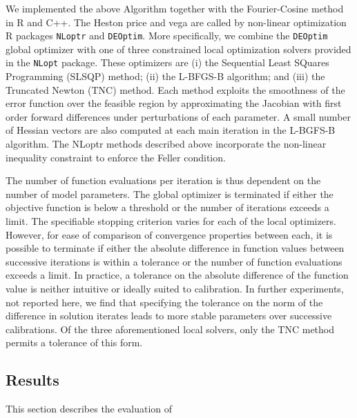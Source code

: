\documentclass{article}
\begin{document}
We implemented the above Algorithm together with the Fourier-Cosine method in R and C++. The Heston price and vega are called by non-linear optimization R packages \verb|NLoptr| and \verb|DEOptim|\cite{Price2006,Ardia2011b}.  More specifically, we combine the \verb|DEOptim| global optimizer with  
one of three constrained local optimization solvers provided in the \verb|NLopt| package. These optimizers are (i) the Sequential Least SQuares Programming (SLSQP) method; (ii) the L-BFGS-B algorithm; and (iii) the Truncated Newton (TNC) method.  Each method exploits the smoothness of the error function over the feasible region by approximating the Jacobian with first order forward differences under perturbations of each parameter.  A small number of Hessian vectors are also computed at each main iteration in the L-BGFS-B algorithm.  The  NLoptr methods described above incorporate the non-linear inequality constraint to enforce the Feller condition.

The number of function evaluations per iteration is thus dependent on the number of model parameters. The global optimizer is terminated if either the objective function is below a threshold or the number of iterations exceeds a limit. The specifiable stopping criterion varies for each of the local optimizers. However, for ease of comparison of convergence properties between each,  it is possible to terminate if either the absolute difference in function values  between successive iterations is within a tolerance or the number of function evaluations exceeds a limit.  In practice, a tolerance on the absolute difference of the function value is neither intuitive or ideally suited to calibration.  In further experiments, not reported here, we find that specifying the tolerance on the norm of the difference in solution iterates leads to more stable parameters over successive calibrations. Of the three aforementioned local solvers, only the TNC method permits a tolerance of this form. 
  
\subsection{Results}
This section describes the evaluation of 
\end{document}
